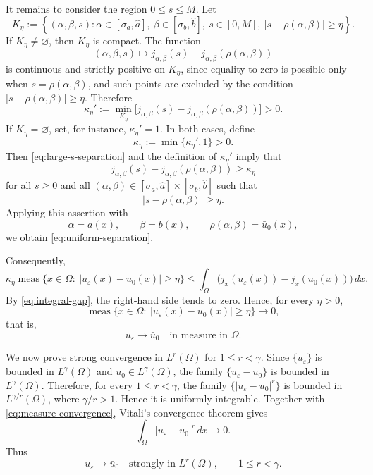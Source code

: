 \documentclass[preprint,11pt]{elsarticle}
\numberwithin{equation}{section}
\begin{document}
It remains to consider the region \(0\le s\le M\). Let
\[
K_\eta
:=
\left\{
(\alpha,\beta,s):
\alpha\in[\sigma_a,\hat a],\
\beta\in[\sigma_b,\hat b],\
s\in[0,M],\
|s-\rho(\alpha,\beta)|\ge\eta
\right\}.
\]
If \(K_\eta\ne\varnothing\), then \(K_\eta\) is compact. The function
\[
(\alpha,\beta,s)
\mapsto
j_{\alpha,\beta}(s)-j_{\alpha,\beta}(\rho(\alpha,\beta))
\]
is continuous and strictly positive on \(K_\eta\), since equality to zero is
possible only when \(s=\rho(\alpha,\beta)\), and such points are excluded by
the condition \(|s-\rho(\alpha,\beta)|\ge\eta\). Therefore
\[
\kappa_\eta'
:=
\min_{K_\eta}
\bigl[
j_{\alpha,\beta}(s)-j_{\alpha,\beta}(\rho(\alpha,\beta))
\bigr]
>0 .
\]
If \(K_\eta=\varnothing\), set, for instance, \(\kappa_\eta'=1\). In both
cases, define
\[
\kappa_\eta:=\min\{\kappa_\eta',1\}>0.
\]
Then \eqref{eq:large-s-separation} and the definition of \(\kappa_\eta'\)
imply that
\[
j_{\alpha,\beta}(s)-j_{\alpha,\beta}(\rho(\alpha,\beta))
\ge
\kappa_\eta
\]
for all \(s\ge0\) and all
\((\alpha,\beta)\in[\sigma_a,\hat a]\times[\sigma_b,\hat b]\) such that
\[
|s-\rho(\alpha,\beta)|\ge\eta .
\]
Applying this assertion with
\[
\alpha=a(x),
\qquad
\beta=b(x),
\qquad
\rho(\alpha,\beta)=\bar u_0(x),
\]
we obtain \eqref{eq:uniform-separation}.

Consequently,
\[
\kappa_\eta
\operatorname{meas}
\{x\in\Omega:\ |u_\varepsilon(x)-\bar u_0(x)|\ge\eta\}
\le
\int_\Omega
\bigl(
j_x(u_\varepsilon(x))-j_x(\bar u_0(x))
\bigr)\,dx .
\]
By \eqref{eq:integral-gap}, the right-hand side tends to zero. Hence, for
every \(\eta>0\),
\[
\operatorname{meas}
\{x\in\Omega:\ |u_\varepsilon(x)-\bar u_0(x)|\ge\eta\}
\to0,
\]
that is,
\begin{equation}\label{eq:measure-convergence}
	u_\varepsilon\to\bar u_0
	\quad\text{in measure in }\Omega .
\end{equation}

We now prove strong convergence in \(L^r(\Omega)\) for \(1\le r<\gamma\).
Since \(\{u_\varepsilon\}\) is bounded in \(L^\gamma(\Omega)\) and
\(\bar u_0\in L^\gamma(\Omega)\), the family
\(\{u_\varepsilon-\bar u_0\}\) is bounded in \(L^\gamma(\Omega)\).
Therefore, for every \(1\le r<\gamma\), the family
\(\{|u_\varepsilon-\bar u_0|^r\}\) is bounded in
\(L^{\gamma/r}(\Omega)\), where \(\gamma/r>1\). Hence it is uniformly
integrable. Together with \eqref{eq:measure-convergence}, Vitali's
convergence theorem gives
\[
\int_\Omega |u_\varepsilon-\bar u_0|^r\,dx\to0 .
\]
Thus
\[
u_\varepsilon\to\bar u_0
\quad\text{strongly in }L^r(\Omega),
\qquad
1\le r<\gamma .
\]
\end{document}
